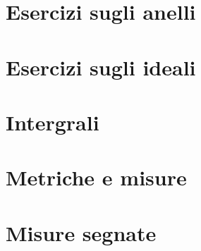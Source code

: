 \section{Esercizi sugli anelli} 
\section{Esercizi sugli ideali} 
\section{Intergrali} 
\section{Metriche e misure} 
\section{Misure segnate} 
